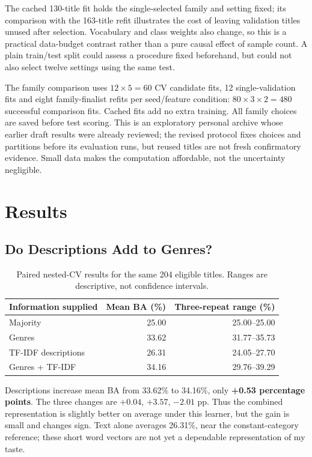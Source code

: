 \documentclass[11pt,letterpaper]{article}
\begin{document}
The cached 130-title fit holds the single-selected family and setting fixed; its comparison with the 163-title refit illustrates the cost of leaving validation titles unused after selection. Vocabulary and class weights also change, so this is a practical data-budget contrast rather than a pure causal effect of sample count. A plain train/test split could assess a procedure fixed beforehand, but could not also select twelve settings using the same test.

The family comparison uses $12\times5=60$ CV candidate fits, 12 single-validation fits and eight family-finalist refits per seed/feature condition: $80\times3\times2=480$ successful comparison fits. Cached fits add no extra training. All family choices are saved before test scoring. This is an exploratory personal archive whose earlier draft results were already reviewed; the revised protocol fixes choices and partitions before its evaluation runs, but reused titles are not fresh confirmatory evidence. Small data makes the computation affordable, not the uncertainty negligible.

\FloatBarrier
\section{Results}
\subsection{Do Descriptions Add to Genres?}

\begin{table}[htbp]\centering\small
\begin{tabular}{@{}lrr@{}}\toprule
Information supplied &Mean BA (\%) &Three-repeat range (\%)\\\midrule
Majority&25.00&25.00--25.00\\
Genres&33.62&31.77--35.73\\
TF-IDF descriptions&26.31&24.05--27.70\\
Genres + TF-IDF&34.16&29.76--39.29\\
\bottomrule\end{tabular}
\caption{Paired nested-CV results for the same 204 eligible titles. Ranges are descriptive, not confidence intervals.}\label{tab:primary}\end{table}

Descriptions increase mean BA from 33.62\% to 34.16\%, only \textbf{+0.53 percentage points}. The three changes are $+0.04$, $+3.57$, $-2.01$ pp. Thus the combined representation is slightly better on average under this learner, but the gain is small and changes sign. Text alone averages 26.31\%, near the constant-category reference; these short word vectors are not yet a dependable representation of my taste.
\end{document}

